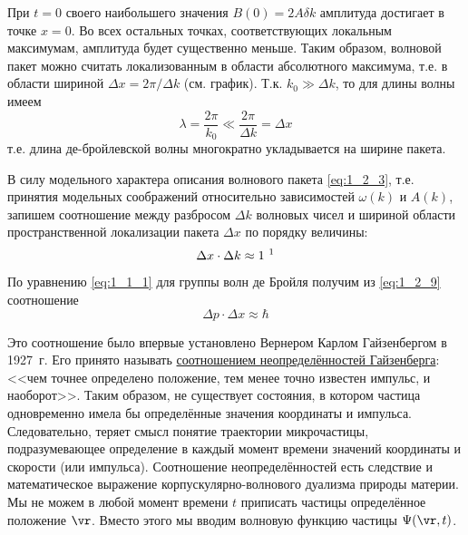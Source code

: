 При $t = 0$ своего наибольшего значения $B(0) = 2A \delta k$ амплитуда достигает в точке $x = 0$. Во всех остальных точках, соответствующих локальным максимумам, амплитуда будет существенно меньше. Таким образом, волновой пакет можно считать локализованным в области абсолютного максимума, т.е. в области шириной $\Delta x = 2\pi / \Delta k$ (см. график). Т.к. $k_0 \gg \Delta k$, то для длины волны имеем
$$
\lambda = \frac{2 \pi}{k_0} \ll \frac{2 \pi}{\Delta k} = \Delta x
$$%
%
т.е. длина де-бройлевской волны многократно укладывается на ширине пакета.

В силу модельного характера описания волнового пакета \eqref{eq:1_2_3}, т.е. принятия модельных соображений относительно зависимостей $\omega(k)$ и $A(k)$, запишем соотношение между разбросом $\Delta k$ волновых чисел и шириной области пространственной локализации пакета $\Delta x$ по порядку величины:
\begin{equation}
\label{eq:1_2_9}
\Delta x \cdot \Delta k \approx 1 ~\text{\footnotemark}
\end{equation}


По уравнению \eqref{eq:1_1_1} для группы волн де Бройля получим из \eqref{eq:1_2_9} соотношение
\begin{equation}
\label{eq:1_2_10}
\boxed{\Delta p \cdot \Delta x \approx \hbar}
\end{equation}

Это соотношение было впервые установлено Вернером Карлом Гайзенбергом в 1927~г. Его принято называть \underline{соотношением неопределённостей Гайзенберга}: <<чем точнее определено положение, тем менее точно известен импульс, и наоборот>>. Таким образом, не существует состояния, в котором частица одновременно имела бы определённые значения координаты и импульса. Следовательно, теряет смысл понятие траектории микрочастицы, подразумевающее определение в каждый момент времени значений координаты и скорости (или импульса). Соотношение неопределённостей есть следствие и математическое выражение корпускулярно-волнового дуализма природы материи. Мы не можем в любой момент времени $t$ приписать частицы определённое положение $\vr$. Вместо этого мы вводим волновую функцию частицы $\Psi(\vr, t)$.


